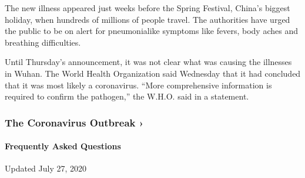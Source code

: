 The new illness appeared just weeks before the Spring Festival, China's
biggest holiday, when hundreds of millions of people travel. The
authorities have urged the public to be on alert for pneumonialike
symptoms like fevers, body aches and breathing difficulties.

Until Thursday's announcement, it was not clear what was causing the
illnesses in Wuhan. The World Health Organization said Wednesday that it
had concluded that it was most likely a coronavirus. ``More
comprehensive information is required to confirm the pathogen,'' the
W.H.O. said in a statement.

\href{https://www.nytimes3xbfgragh.onion/news-event/coronavirus?action=click\&pgtype=Article\&state=default\&region=MAIN_CONTENT_3\&context=storylines_faq}{}

\hypertarget{the-coronavirus-outbreak-}{%
\subsubsection{The Coronavirus Outbreak
›}\label{the-coronavirus-outbreak-}}

\hypertarget{frequently-asked-questions}{%
\paragraph{Frequently Asked
Questions}\label{frequently-asked-questions}}

Updated July 27, 2020


